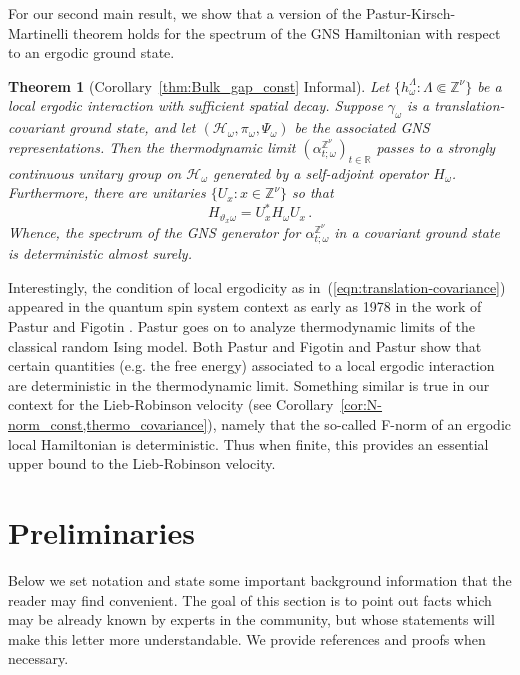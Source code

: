 \documentclass{article}
\newcommand{\Znu}{\mathbb{Z}^\nu}
\newcommand{\R}{\mathbb R}
\newcommand{\<}{\langle}
\renewcommand{\>}{\rangle}
\newtheorem{thmx}{Theorem}
\theoremstyle{definition}
\numberwithin{equation}{section}
\begin{document}
For our second main result, we show that a version of the Pastur-Kirsch-Martinelli theorem holds for the spectrum of the GNS Hamiltonian with respect to an ergodic ground state.
\begin{thmx}[Corollary~\ref{thm:Bulk_gap_const} Informal]\label{thmx:spec}
    Let $\{h^{\Lambda}_\omega \colon \Lambda \Subset \Znu\}$ be a local ergodic interaction with sufficient spatial decay. Suppose $\gamma_\omega$ is a translation-covariant ground state, and let $(\mathcal{H}_\omega, \pi_\omega, \Psi_\omega)$ be the associated GNS representations. Then the thermodynamic limit $(\alpha^{\Znu}_{t;\omega})_{t\in \R}$ passes to a strongly continuous unitary group on $\mathcal{H}_\omega$ generated by a self-adjoint operator $H_\omega$. Furthermore, there are unitaries $\{U_x\colon x\in \Znu\}$ so that 
    	\[
		H_{\vartheta_x \omega} = U^*_x H_\omega U_x\,.
	\] Whence, the spectrum of the GNS generator for $\alpha^{\Znu}_{t;\omega}$ in a covariant ground state is deterministic almost surely.
\end{thmx}

Interestingly, the condition of local ergodicity as in~(\ref{eqn:translation-covariance}) appeared in the quantum spin system context as early as 1978 in the work of Pastur and Figotin \cite{PasturFigotin}. Pastur \cite{Pastur} goes on to analyze thermodynamic limits of the classical random Ising model. Both Pastur and Figotin \cite{PasturFigotin} and Pastur \cite{Pastur} show that certain quantities (e.g. the free energy) associated to a local ergodic interaction are deterministic in the thermodynamic limit. Something similar is true in our context for the Lieb-Robinson velocity (see Corollary~\ref{cor:N-norm_const,thermo_covariance}), namely that the so-called F-norm of an ergodic local Hamiltonian is deterministic. Thus when finite, this provides an essential upper bound to the Lieb-Robinson velocity. 





\section{Preliminaries}
Below we set notation and state some important background information that the reader may find convenient. The goal of this section is to point out facts which may be already known by experts in the community, but whose statements will make this letter more understandable. We provide references and proofs when necessary. 
\end{document}
